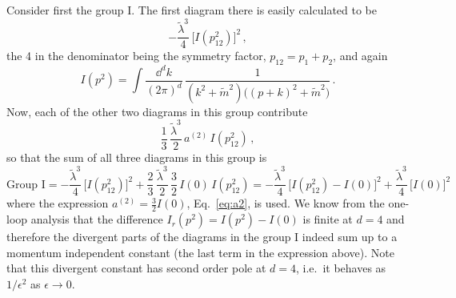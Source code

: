 Consider first the group I. The first diagram there is easily calculated to be
\[
-\frac{\tilde\lambda^3}4\,\bigl[I(p_{12}^2)\bigr]^2\,,
\]
the 4 in the denominator being the symmetry factor, $p_{12}=p_1+p_2$, and again
\[
I(p^2)=\int\frac{\dd^dk}{(2\pi)^d}\,\frac1{(k^2+\tilde m^2)\bigl((p+k)^2+\tilde m^2\bigr)}\,.
\]
Now, each of the other two diagrams in this group contribute
\[
\frac13\,\frac{\tilde\lambda^3}2\,a^{(2)}\,I(p_{12}^2)\,,
\]
so that the sum of all three diagrams in this group is
\[
\text{Group I}=-\frac{\tilde\lambda^3}4\,\bigl[I(p_{12}^2)\bigr]^2+\frac23\,\frac{\tilde\lambda^3}2\,\frac32\,I(0)\,I(p_{12}^2)
=-\frac{\tilde\lambda^3}4\,\bigl[I(p_{12}^2)-I(0)\bigr]^2+\frac{\tilde\lambda^3}4\,\bigl[I(0)\bigr]^2
\]
where the expression $a^{(2)}=\frac32I(0)$, Eq.~\eqref{eq:a2}, is used. We know
from the one-loop analysis that the difference $I_r(p^2)=I(p^2)-I(0)$ is finite
at $d=4$ and therefore the divergent parts of the diagrams in the group I indeed
sum up to a momentum independent constant (the last term in the expression
above). Note that this divergent constant has second order pole at $d=4$, i.e.\
it behaves as $1/\epsilon^2$ as $\epsilon\to0$.

